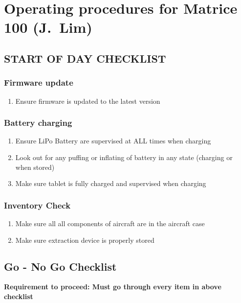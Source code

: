 \clearpage
\section{Operating procedures for Matrice 100 (J.~Lim)}
\label{app:OP}

\subsection{START OF DAY CHECKLIST}

\subsubsection{Firmware update}
\begin{enumerate}
\setlength{\itemsep}{0em}
\setlength{\parskip}{0em}
\item Ensure firmware is updated to the latest version
\end{enumerate}

\subsubsection{Battery charging}
\begin{enumerate}
\setlength{\itemsep}{0em}
\setlength{\parskip}{0em}
\item Ensure LiPo Battery are supervised at ALL times when charging
\item Look out for any puffing or inflating of battery in any state (charging or when stored)
\item Make sure tablet is fully charged and supervised when charging
\end{enumerate}

\subsubsection{Inventory Check}
\begin{enumerate}
\setlength{\itemsep}{0em}
\setlength{\parskip}{0em}
\item Make sure all all components of aircraft are in the aircraft case
\item Make sure extraction device is properly stored 
\end{enumerate}



\clearpage
\subsection{Go - No Go Checklist}
\textbf{Requirement to proceed: Must go through every item in above checklist}

